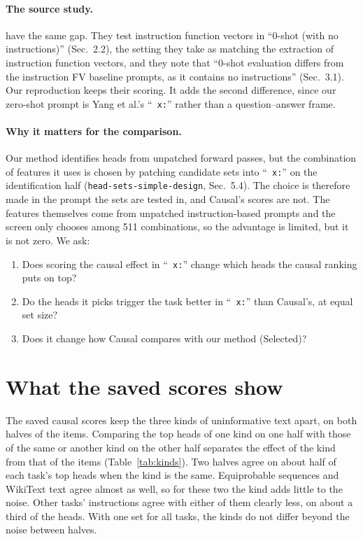 \documentclass[10pt,a4paper]{article}
\newcommand{\p}[1]{``\texttt{#1}''}
\newcommand{\simpledoc}{\texttt{head-sets-simple-design}}
\begin{document}
\paragraph{The source study.} \citet{davidson2025different} have the same gap. They test instruction function vectors in ``0-shot (with no instructions)'' (Sec.~2.2), the setting they take as matching the extraction of instruction function vectors, and they note that ``0-shot evaluation differs from the instruction FV baseline prompts, as it contains no instructions'' (Sec.~3.1). Our reproduction keeps their scoring. It adds the second difference, since our zero-shot prompt is Yang et al.'s \p{ x:} rather than a question--answer frame.

\paragraph{Why it matters for the comparison.} Our method identifies heads from unpatched forward passes, but the combination of features it uses is chosen by patching candidate sets into \p{ x:} on the identification half (\simpledoc, Sec.~5.4). The choice is therefore made in the prompt the sets are tested in, and Causal's scores are not. The features themselves come from unpatched instruction-based prompts and the screen only chooses among 511 combinations, so the advantage is limited, but it is not zero. We ask:
\begin{enumerate}[label=\textbf{Q\arabic*}]
\item Does scoring the causal effect in \p{ x:} change which heads the causal ranking puts on top?
\item Do the heads it picks trigger the task better in \p{ x:} than Causal's, at equal set size?
\item Does it change how Causal compares with our method (Selected)?
\end{enumerate}

\section{What the saved scores show}\label{sec:known}

The saved causal scores keep the three kinds of uninformative text apart, on both halves of the items. Comparing the top heads of one kind on one half with those of the same or another kind on the other half separates the effect of the kind from that of the items (Table~\ref{tab:kinds}). Two halves agree on about half of each task's top heads when the kind is the same. Equiprobable sequences and WikiText text agree almost as well, so for these two the kind adds little to the noise. Other tasks' instructions agree with either of them clearly less, on about a third of the heads. With one set for all tasks, the kinds do not differ beyond the noise between halves.
\end{document}
